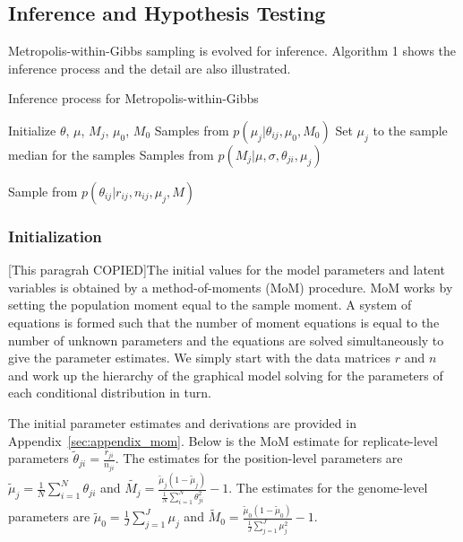 \documentclass[11pt,reqno]{amsart}
\begin{document}
\subsection{Inference and Hypothesis Testing}

Metropolis-within-Gibbs sampling is evolved for inference. Algorithm 1 shows the inference process and the detail are also illustrated.

\begin{algorithm}[ht]
\caption{Inference process for Metropolis-within-Gibbs}
\label{alg:metro_gibbs}
\begin{algorithmic}[1]

\State Initialize $\theta$, $\mu$, $M_j$, $\mu_0$, $M_0$
\Repeat
{}
  \State Samples from $p \left( \mu_j |\theta_{ij},\mu_0,M_0\right)$ 
  \State Set $\mu_j$ to the sample median for the samples
  \State Samples from $p \left( M_{j} |\mu,\sigma, \theta_{ji},\mu_j\right)$ 

	\State Sample from $p \left( \theta_{ij} |r_{ij},n_{ij},\mu_j,M \right)$ 
  \EndFor

\EndFor
{}
\end{algorithmic}
\end{algorithm}

\subsubsection{Initialization}
[This paragrah COPIED]The initial values for the model parameters and latent variables is obtained by a method-of-moments (MoM) procedure. MoM works by setting the population moment equal to the sample moment.
A system of equations is formed such that the number of moment equations is equal to the number of unknown parameters and the equations are solved simultaneously to give the parameter estimates.
We simply start with the data matrices $r$ and $n$ and work up the hierarchy of the graphical model solving for the parameters of each conditional distribution in turn.

The initial parameter estimates and derivations are provided in Appendix~\ref{sec:appendix_mom}. Below is the MoM estimate for replicate-level parameters
$\tilde{\theta}_{ji} = \frac{r_{ji}} {n_{ji}}$.
The estimates for the position-level parameters are
$\tilde{\mu}_j = \frac{1}{N} \sum_{i=1}^N \theta_{ji}$
and
$\tilde{M_j} = \frac{ \tilde{\mu}_j (1 - \tilde{\mu}_j ) } { \frac{1}{N} \sum_{i=1}^N \theta_{ji}^2 } -1$.
The estimates for the genome-level parameters are
$\tilde{\mu}_0 = \frac{1}{J} \sum_{j=1}^J \mu_j$
and
$\tilde{M}_0 = \frac{ \tilde{\mu}_0 (1 - \tilde{\mu}_0 ) } {\frac{1}{J} \sum_{j=1}^J \mu_j^2 } -1$.
\end{document}
